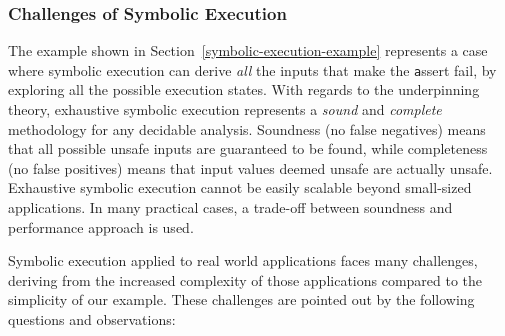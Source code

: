 \subsubsection{Challenges of Symbolic Execution}
\label{example-discussion}

The example shown in Section~\ref{symbolic-execution-example} represents a case where symbolic execution can derive {\em all} the inputs that make the {\texttt assert} fail, by exploring all the possible execution states. With regards to the underpinning theory, exhaustive symbolic execution represents a {\em sound} and {\em complete} methodology for any decidable analysis. Soundness (no false negatives) means that all possible unsafe inputs are guaranteed to be found, while completeness (no false positives) means that  input values deemed unsafe are actually unsafe. Exhaustive symbolic execution cannot be easily scalable beyond small-sized applications. In many practical cases, a trade-off between soundness and performance approach is used.

Symbolic execution applied to real world applications faces many challenges, deriving from the increased complexity of those applications compared to the simplicity of our example. These challenges are pointed out by the following questions and observations:

